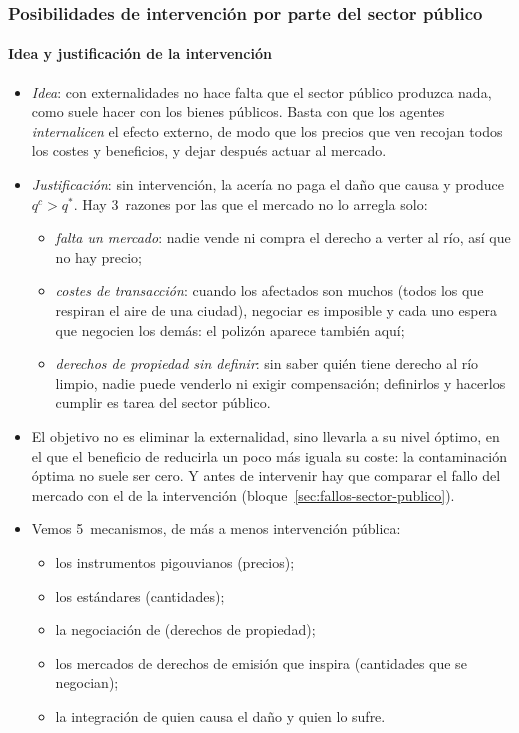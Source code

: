 \documentclass[11pt]{article}
\begin{document}
\subsubsection{Posibilidades de intervención por parte del sector público}\label{sec:externalidades-intervencion}

\paragraph{Idea y justificación de la intervención}
\begin{itemize}
\item \emph{Idea}: con externalidades no hace falta que el sector público produzca nada, como suele hacer con los bienes públicos. Basta con que los agentes \emph{internalicen} el efecto externo, de modo que los precios que ven recojan todos los costes y beneficios, y dejar después actuar al mercado.
\item \emph{Justificación}: sin intervención, la acería no paga el daño que causa y produce $q^c>q^*$. Hay 3~razones por las que el mercado no lo arregla solo:
  \begin{itemize}
  \item \emph{falta un mercado}: nadie vende ni compra el derecho a verter al río, así que no hay precio\nocite{Arrow1969Organization};
  \item \emph{costes de transacción}: cuando los afectados son muchos (todos los que respiran el aire de una ciudad), negociar es imposible y cada uno espera que negocien los demás: el polizón aparece también aquí;
  \item \emph{derechos de propiedad sin definir}: sin saber quién tiene derecho al río limpio, nadie puede venderlo ni exigir compensación; definirlos y hacerlos cumplir es tarea del sector público\nocite{Coase1960Problem}.
  \end{itemize}
\item El objetivo no es eliminar la externalidad, sino llevarla a su nivel óptimo, en el que el beneficio de reducirla un poco más iguala su coste: la contaminación óptima no suele ser cero. Y antes de intervenir hay que comparar el fallo del mercado con el de la intervención (bloque~\ref{sec:fallos-sector-publico}).
\item Vemos 5~mecanismos, de más a menos intervención pública:
  \begin{itemize}
  \item los instrumentos pigouvianos (precios);
  \item los estándares (cantidades);
  \item la negociación de  (derechos de propiedad);
  \item los mercados de derechos de emisión que inspira (cantidades que se negocian);
  \item la integración de quien causa el daño y quien lo sufre.
  \end{itemize}
\end{itemize}
\end{document}
